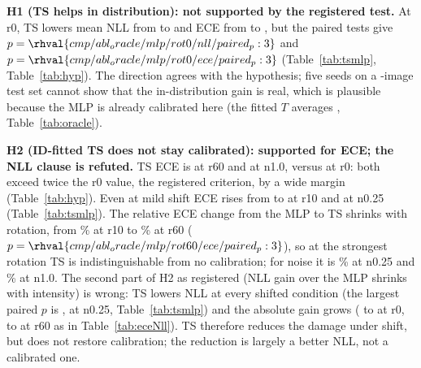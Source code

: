 \textbf{H1 (TS helps in distribution): not supported by the registered test.} At r0, TS lowers mean NLL from  to  and ECE from  to , but the paired tests give $p=\rhval{cmp/abl_oracle/mlp/rot0/nll/paired_p:3}$ and $p=\rhval{cmp/abl_oracle/mlp/rot0/ece/paired_p:3}$ (Table~\ref{tab:tsmlp}, Table~\ref{tab:hyp}). The direction agrees with the hypothesis; five seeds on a -image test set cannot show that the in-distribution gain is real, which is plausible because the MLP is already calibrated here (the fitted $T$ averages , Table~\ref{tab:oracle}).

\textbf{H2 (ID-fitted TS does not stay calibrated): supported for ECE; the NLL clause is refuted.} TS ECE is  at r60 and  at n1.0, versus  at r0: both exceed twice the r0 value, the registered criterion, by a wide margin (Table~\ref{tab:hyp}). Even at mild shift ECE rises from  to  at r10 and  at n0.25 (Table~\ref{tab:tsmlp}). The relative ECE change from the MLP to TS shrinks with rotation, from \% at r10 to \% at r60 ($p=\rhval{cmp/abl_oracle/mlp/rot60/ece/paired_p:3}$), so at the strongest rotation TS is indistinguishable from no calibration; for noise it is \% at n0.25 and \% at n1.0. The second part of H2 as registered (NLL gain over the MLP shrinks with intensity) is wrong: TS lowers NLL at every shifted condition (the largest paired $p$ is , at n0.25, Table~\ref{tab:tsmlp}) and the absolute gain grows ( to  at r0,  to  at r60 as in Table~\ref{tab:eceNll}). TS therefore reduces the damage under shift, but does not restore calibration; the reduction is largely a better NLL, not a calibrated one.

